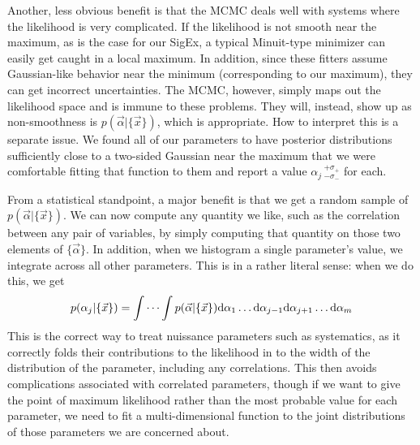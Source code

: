 Another, less obvious benefit is that the MCMC deals well with systems
where the likelihood is very complicated.  If the likelihood is not
smooth near the maximum, as is the case for our SigEx, a typical
Minuit-type minimizer can easily get caught in a local maximum.  In
addition, since these fitters assume Gaussian-like behavior near the
minimum (corresponding to our maximum), they can get incorrect
uncertainties.  The MCMC, however, simply maps out the likelihood
space and is immune to these problems.  They will, instead, show up as
non-smoothness is $p(\vec{\alpha}|\{\vec{x}\})$, which is appropriate.
How to interpret this is a separate issue.  We found all of our
parameters to have posterior distributions sufficiently close to a
two-sided Gaussian near the maximum that we were comfortable fitting
that function to them and report a value
$\alpha_j\,^{+\sigma_+}_{-\sigma_-}$ for each.

From a statistical standpoint, a major benefit is that we get a random
sample of $p(\vec{\alpha}|\{\vec{x}\})$.  We can now compute any
quantity we like, such as the correlation between any pair of
variables, by simply computing that quantity on those two elements of
$\{\vec{\alpha}\}$.  In addition, when we histogram a single parameter's
value, we integrate across all other parameters.  This is in a rather
literal sense: when we do this, we get
\begin{equation}
p(\alpha_j|\{\vec{x}\}) = \idotsint p(\vec{\alpha}|\{\vec{x}\}) 
\mathrm{d}\alpha_1 \ldots \mathrm{d}\alpha_{j-1} \mathrm{d}\alpha_{j+1}
\ldots \mathrm{d} \alpha_m
\end{equation}
This is the correct way to treat nuissance parameters such as
systematics, as it correctly folds their contributions to the
likelihood in to the width of the distribution of the parameter,
including any correlations.  This then avoids complications associated
with correlated parameters, though if we want to give the point of
maximum likelihood rather than the most probable value for each
parameter, we need to fit a multi-dimensional function to the joint
distributions of those parameters we are concerned about.

